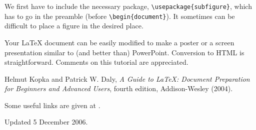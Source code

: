 \documentclass[12pt]{article}
\begin{document}
				   We first have to include the necessary package,
				   \verb+\usepackage{subfigure}+, which has to go in the
				   preamble (before
						   \verb+\begin{document}+). It sometimes can be
				   difficult to place a figure in
				   the desired place.

				   Your LaTeX document can be easily modified to make a
				   poster or a screen
				   presentation similar to (and better than) PowerPoint.
				   Conversion to HTML is
				   straightforward. Comments on this tutorial are
				   appreciated.

				   \begin{thebibliography}{5}

				   Helmut Kopka and Patrick W. Daly,
				   \textsl{A Guide to
					   \LaTeX: Document Preparation for Beginners and
						   Advanced Users},
						   fourth edition, Addison-Wesley (2004).

						   Some useful links are
						   given at \url{}.

						   \end{thebibliography}

{\small \noindent Updated 5 December 2006.}
\end{document}
